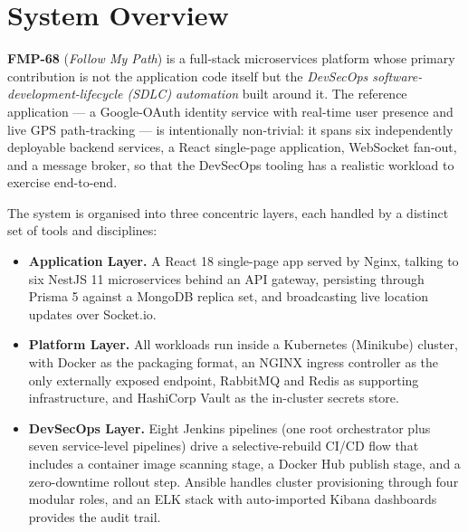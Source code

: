 \documentclass[11pt,a4paper]{article}
\begin{document}
\listoftables
\thispagestyle{empty}
\newpage

\setcounter{page}{1}

\section{System Overview}

\textbf{FMP-68} (\emph{Follow My Path}) is a full-stack microservices
platform whose primary contribution is not the application code itself
but the \emph{DevSecOps software-development-lifecycle (SDLC)
automation} built around it.  The
reference application — a Google-OAuth identity service with real-time user
presence and live GPS path-tracking — is intentionally non-trivial: it
spans six independently deployable backend services, a React single-page
application, WebSocket fan-out, and a message broker, so that the
DevSecOps tooling has a realistic workload to exercise end-to-end.

The system is organised into three concentric layers, each handled by a
distinct set of tools and disciplines:

\begin{itemize}[leftmargin=*]
  \item \textbf{Application Layer.}  A React 18 single-page app served by
        Nginx, talking to six NestJS 11 microservices behind an API
        gateway, persisting through Prisma 5 against a MongoDB replica
        set, and broadcasting live location updates over Socket.io.
  \item \textbf{Platform Layer.}  All workloads run inside a Kubernetes
        (Minikube) cluster, with Docker as the packaging format, an
        NGINX ingress controller as the only externally exposed
        endpoint, RabbitMQ and Redis as supporting infrastructure, and
        HashiCorp Vault as the in-cluster secrets store.
  \item \textbf{DevSecOps Layer.}  Eight Jenkins pipelines (one root
        orchestrator plus seven service-level pipelines) drive a
        selective-rebuild CI/CD flow that includes a container image
        scanning stage, a Docker Hub publish stage, and a zero-downtime
        rollout step.  Ansible handles cluster provisioning through
        four modular roles, and an ELK stack with auto-imported Kibana
        dashboards provides the audit trail.
\end{itemize}
\end{document}
